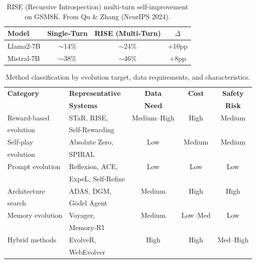 \begin{table}[t]
\centering
\caption{RISE (Recursive Introspection) multi-turn self-improvement on GSM8K. From Qu \& Zhang (NeurIPS 2024).}
\label{tab:bench-rise}
\begin{tabular}{@{}lccc@{}}
\toprule
\textbf{Model} & \textbf{Single-Turn} & \textbf{RISE (Multi-Turn)} & \textbf{$\Delta$} \\
\midrule
Llama2-7B & $\sim$14\% & $\sim$24\% & +10pp \\
Mistral-7B & $\sim$38\% & $\sim$46\% & +8pp \\
\bottomrule
\end{tabular}
\end{table}

\begin{table}[t]
\centering
\caption{Method classification by evolution target, data requirements, and characteristics.}
\label{tab:bench-methods-summary}
\begin{tabular}{@{}llccc@{}}
\toprule
\textbf{Category} & \textbf{Representative} & \textbf{Data} & \textbf{Cost} & \textbf{Safety} \\
 & \textbf{Systems} & \textbf{Need} & & \textbf{Risk} \\
\midrule
Reward-based & STaR, RISE, & Medium--High & High & Medium \\
evolution & Self-Rewarding & & & \\
Self-play & Absolute Zero, & Low & Medium & Medium \\
evolution & SPIRAL & & & \\
Prompt evolution & Reflexion, ACE, & Low & Low & Low \\
 & ExpeL, Self-Refine & & & \\
Architecture & ADAS, DGM, & Medium & High & High \\
search & G\"odel Agent & & & \\
Memory evolution & Voyager, & Medium & Low--Med & Low \\
 & Memory-R1 & & & \\
Hybrid methods & EvolveR, & High & High & Med--High \\
 & WebEvolver & & & \\
\bottomrule
\end{tabular}
\end{table}
